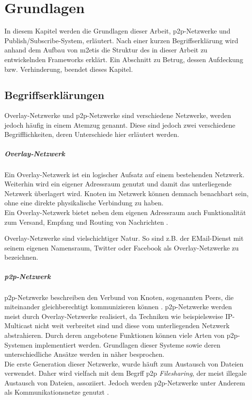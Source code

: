 \chapter{Grundlagen}
\label{chap:grundlagen}

In diesem Kapitel werden die Grundlagen dieser Arbeit, \ac{p2p}-Netzwerke und Publish/Subscribe-System, erläutert. Nach einer kurzen Begriffserklärung wird anhand dem Aufbau von \ac{m2etis} die Struktur des in dieser Arbeit zu entwickelnden Frameworks erklärt. Ein Abschnitt zu Betrug, dessen Aufdeckung bzw. Verhinderung, beendet dieses Kapitel.

\section{Begriffserklärungen}

Overlay-Netzwerke und \ac{p2p}-Netzwerke sind verschiedene Netzwerke, werden jedoch häufig in einem Atemzug genannt. Diese sind jedoch zwei verschiedene Begrifflichkeiten, deren Unterschiede hier erläutert werden.

\paragraph{Overlay-Netzwerk} Ein Overlay-Netzwerk ist ein logischer Aufsatz auf einem bestehenden Netzwerk. Weiterhin wird ein eigener Adressraum genutzt und damit das unterliegende Netzwerk überlagert wird. Knoten im Netzwerk können demnach benachbart sein, ohne eine direkte physikalische Verbindung zu haben.\\
Ein Overlay-Netzwerk bietet neben dem eigenen Adressraum auch Funktionalität zum Versand, Empfang und Routing von Nachrichten \cite{Tannenbaum2003}.

Overlay-Netzwerke sind vielschichtiger Natur. So sind z.B. der EMail-Dienst mit seinem eigenen Namensraum, Twitter oder Facebook als Overlay-Netzwerke zu bezeichnen.

\paragraph{\ac{p2p}-Netzwerk} p2p-Netzwerke beschreiben den Verbund von Knoten, sogenannten Peers, die miteinander gleichberechtigt kommunizieren können \cite{Steinmetz2005}. p2p-Netzwerke werden meist durch Overlay-Netzwerke realisiert, da Techniken wie beispielsweise IP-Multicast \cite{Deering1990Multicast} nicht weit verbreitet sind und diese vom unterliegenden Netzwerk abstrahieren. Durch deren angebotene Funktionen können viele Arten von p2p-Systemen implementiert werden. Grundlagen dieser Systeme sowie deren unterschiedliche Ansätze werden in  näher besprochen.\\
Die erste Generation dieser Netzwerke, wurde häuft zum Austausch von Dateien verwendet. Daher wird vielfach mit dem Begrff \ac{p2p} \emph{Filesharing}, der meist illegale Austausch von Dateien, assoziiert. Jedoch werden p2p-Netzwerke unter Anderem als Kommunikationsnetze genutzt \cite{Darlagiannis2006Peertopeer}. 

